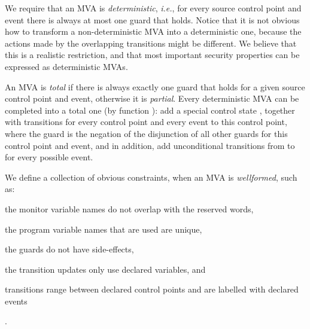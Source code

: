 We require that an MVA is \emph{deterministic}, \emph{i.e.}, for every
source control point and event there is always at most one guard that
holds. Notice that it is not obvious how to transform a
non-deterministic MVA into a deterministic one, because the actions
made by the overlapping transitions might be different. We believe
that this is a realistic restriction, and that most important security
properties can be expressed as deterministic MVAs.

An MVA is \emph{total} if there is always exactly one guard that holds
for a given source control point and event, otherwise it is
\emph{partial}. Every deterministic MVA can be completed into a total
one (by function \complete): add a special control state
\halted, together with transitions for every control point and every event
to this \halted control point, where the guard is the negation of the
disjunction of all other guards for this control point and event, and
in addition, add unconditional transitions from \halted to \halted for
every possible event.


We define a collection of obvious constraints, when an MVA is
\emph{wellformed}, such as:
\begin{inparaenum}
\item the monitor variable names do not overlap with the reserved
words,
\item the program variable names that are used are unique,
\item the guards do not have side-effects,
\item the transition updates only use declared variables, and
\item transitions range between declared control points and are
labelled with declared events
\end{inparaenum}.


